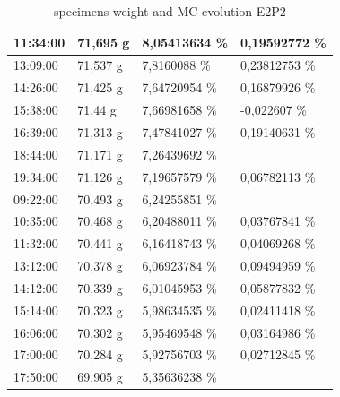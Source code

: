 \begin{table}[]
\begin{tabular}{llll}
		\multicolumn{1}{|l|}{11:34:00} & \multicolumn{1}{l|}{71,695 g} & \multicolumn{1}{l|}{8,05413634   \%} & \multicolumn{1}{l|}{0,19592772 \%} \\ \hline
		\multicolumn{1}{|l|}{13:09:00} & \multicolumn{1}{l|}{71,537 g} & \multicolumn{1}{l|}{7,8160088   \%} & \multicolumn{1}{l|}{0,23812753 \%} \\ \hline
		\multicolumn{1}{|l|}{14:26:00} & \multicolumn{1}{l|}{71,425 g} & \multicolumn{1}{l|}{7,64720954   \%} & \multicolumn{1}{l|}{0,16879926 \%} \\ \hline
		\multicolumn{1}{|l|}{15:38:00} & \multicolumn{1}{l|}{71,44 g} & \multicolumn{1}{l|}{7,66981658   \%} & \multicolumn{1}{l|}{-0,022607 \%} \\ \hline
		\multicolumn{1}{|l|}{16:39:00} & \multicolumn{1}{l|}{71,313 g} & \multicolumn{1}{l|}{7,47841027   \%} & \multicolumn{1}{l|}{0,19140631 \%} \\ \hline
		\multicolumn{1}{|l|}{18:44:00} & \multicolumn{1}{l|}{71,171 g} & \multicolumn{1}{l|}{7,26439692   \%} &  \\ \hline
		\multicolumn{1}{|l|}{19:34:00} & \multicolumn{1}{l|}{71,126 g} & \multicolumn{1}{l|}{7,19657579   \%} & \multicolumn{1}{l|}{0,06782113 \%} \\ \hline
		\multicolumn{1}{|l|}{\cellcolor[HTML]{A5A5A5}09:22:00} & \multicolumn{1}{l|}{70,493 g} & \multicolumn{1}{l|}{6,24255851   \%} &  \\ \hline
		\multicolumn{1}{|l|}{10:35:00} & \multicolumn{1}{l|}{70,468 g} & \multicolumn{1}{l|}{6,20488011   \%} & \multicolumn{1}{l|}{0,03767841 \%} \\ \hline
		\multicolumn{1}{|l|}{11:32:00} & \multicolumn{1}{l|}{70,441 g} & \multicolumn{1}{l|}{6,16418743   \%} & \multicolumn{1}{l|}{0,04069268 \%} \\ \hline
		\multicolumn{1}{|l|}{13:12:00} & \multicolumn{1}{l|}{70,378 g} & \multicolumn{1}{l|}{6,06923784   \%} & \multicolumn{1}{l|}{0,09494959   \%} \\ \hline
		\multicolumn{1}{|l|}{14:12:00} & \multicolumn{1}{l|}{70,339 g} & \multicolumn{1}{l|}{6,01045953   \%} & \multicolumn{1}{l|}{0,05877832   \%} \\ \hline
		\multicolumn{1}{|l|}{15:14:00} & \multicolumn{1}{l|}{70,323 g} & \multicolumn{1}{l|}{5,98634535   \%} & \multicolumn{1}{l|}{0,02411418   \%} \\ \hline
		\multicolumn{1}{|l|}{16:06:00} & \multicolumn{1}{l|}{70,302 g} & \multicolumn{1}{l|}{5,95469548   \%} & \multicolumn{1}{l|}{0,03164986   \%} \\ \hline
		\multicolumn{1}{|l|}{17:00:00} & \multicolumn{1}{l|}{70,284 g} & \multicolumn{1}{l|}{5,92756703   \%} & \multicolumn{1}{l|}{0,02712845   \%} \\ \hline
		\multicolumn{1}{|l|}{17:50:00} & \multicolumn{1}{l|}{69,905 g} & \multicolumn{1}{l|}{\cellcolor[HTML]{FFC000}5,35636238   \%} &  \\ \cline{1-3}
	\end{tabular}
	\caption{specimens weight and MC evolution E2P2}
	\label{tab:Tab8}
\end{table}
